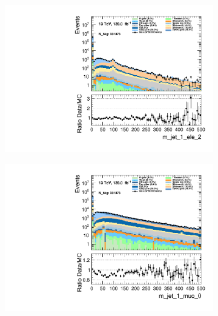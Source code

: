\begin{figure}
\begin{subfigure}{.49\textwidth}
        \includegraphics[width=\textwidth]{Figures/MC_Data_comp/m_jet_1_ele_2.pdf}
        \caption{ }
        \label{fig:fep}
    \end{subfigure}
    \hfill
    \begin{subfigure}{.49\textwidth}
        \includegraphics[width=\textwidth]{Figures/MC_Data_comp/m_jet_1_muo_0.pdf}
        \caption{ }
        \label{fig:fe}
    \end{subfigure}
    \hfill       
    \caption{}
    \label{fig:t}
\end{figure}

